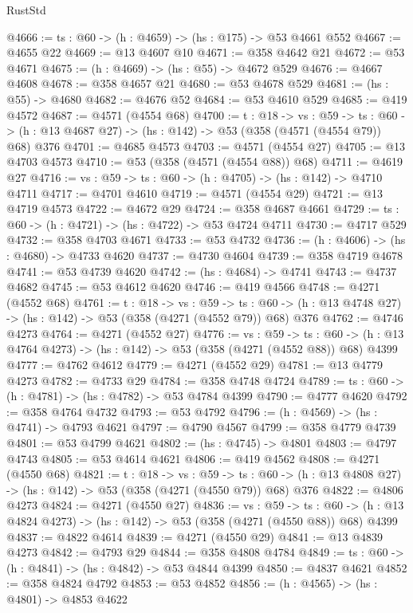 \begin{lexlean}{RustStd}
\begin{coremodule}
@4666 := {ts : @60} -> (h : @4659) -> (hs : @175) -> @53 @4661 @552
@4667 := @4655 @22
@4669 := @13 @4607 @10
@4671 := @358 @4642 @21
@4672 := @53 @4671
@4675 := (h : @4669) -> (hs : @55) -> @4672 @529
@4676 := @4667 @4608
@4678 := @358 @4657 @21
@4680 := @53 @4678 @529
@4681 := (hs : @55) -> @4680
@4682 := @4676 @52
@4684 := @53 @4610 @529
@4685 := @419 @4572
@4687 := @4571 (@4554 @68)
@4700 := {t : @18} ->
  {vs : @59} ->
  {ts : @60} -> (h : @13 @4687 @27) -> (hs : @142) -> @53 (@358 (@4571 (@4554 @79)) @68) @376
@4701 := @4685 @4573
@4703 := @4571 (@4554 @27)
@4705 := @13 @4703 @4573
@4710 := @53 (@358 (@4571 (@4554 @88)) @68)
@4711 := @4619 @27
@4716 := {vs : @59} -> {ts : @60} -> (h : @4705) -> (hs : @142) -> @4710 @4711
@4717 := @4701 @4610
@4719 := @4571 (@4554 @29)
@4721 := @13 @4719 @4573
@4722 := @4672 @29
@4724 := @358 @4687 @4661
@4729 := {ts : @60} -> (h : @4721) -> (hs : @4722) -> @53 @4724 @4711
@4730 := @4717 @529
@4732 := @358 @4703 @4671
@4733 := @53 @4732
@4736 := (h : @4606) -> (hs : @4680) -> @4733 @4620
@4737 := @4730 @4604
@4739 := @358 @4719 @4678
@4741 := @53 @4739 @4620
@4742 := (hs : @4684) -> @4741
@4743 := @4737 @4682
@4745 := @53 @4612 @4620
@4746 := @419 @4566
@4748 := @4271 (@4552 @68)
@4761 := {t : @18} ->
  {vs : @59} ->
  {ts : @60} -> (h : @13 @4748 @27) -> (hs : @142) -> @53 (@358 (@4271 (@4552 @79)) @68) @376
@4762 := @4746 @4273
@4764 := @4271 (@4552 @27)
@4776 := {vs : @59} ->
  {ts : @60} -> (h : @13 @4764 @4273) -> (hs : @142) -> @53 (@358 (@4271 (@4552 @88)) @68) @4399
@4777 := @4762 @4612
@4779 := @4271 (@4552 @29)
@4781 := @13 @4779 @4273
@4782 := @4733 @29
@4784 := @358 @4748 @4724
@4789 := {ts : @60} -> (h : @4781) -> (hs : @4782) -> @53 @4784 @4399
@4790 := @4777 @4620
@4792 := @358 @4764 @4732
@4793 := @53 @4792
@4796 := (h : @4569) -> (hs : @4741) -> @4793 @4621
@4797 := @4790 @4567
@4799 := @358 @4779 @4739
@4801 := @53 @4799 @4621
@4802 := (hs : @4745) -> @4801
@4803 := @4797 @4743
@4805 := @53 @4614 @4621
@4806 := @419 @4562
@4808 := @4271 (@4550 @68)
@4821 := {t : @18} ->
  {vs : @59} ->
  {ts : @60} -> (h : @13 @4808 @27) -> (hs : @142) -> @53 (@358 (@4271 (@4550 @79)) @68) @376
@4822 := @4806 @4273
@4824 := @4271 (@4550 @27)
@4836 := {vs : @59} ->
  {ts : @60} -> (h : @13 @4824 @4273) -> (hs : @142) -> @53 (@358 (@4271 (@4550 @88)) @68) @4399
@4837 := @4822 @4614
@4839 := @4271 (@4550 @29)
@4841 := @13 @4839 @4273
@4842 := @4793 @29
@4844 := @358 @4808 @4784
@4849 := {ts : @60} -> (h : @4841) -> (hs : @4842) -> @53 @4844 @4399
@4850 := @4837 @4621
@4852 := @358 @4824 @4792
@4853 := @53 @4852
@4856 := (h : @4565) -> (hs : @4801) -> @4853 @4622

\end{coremodule}
\end{lexlean}
